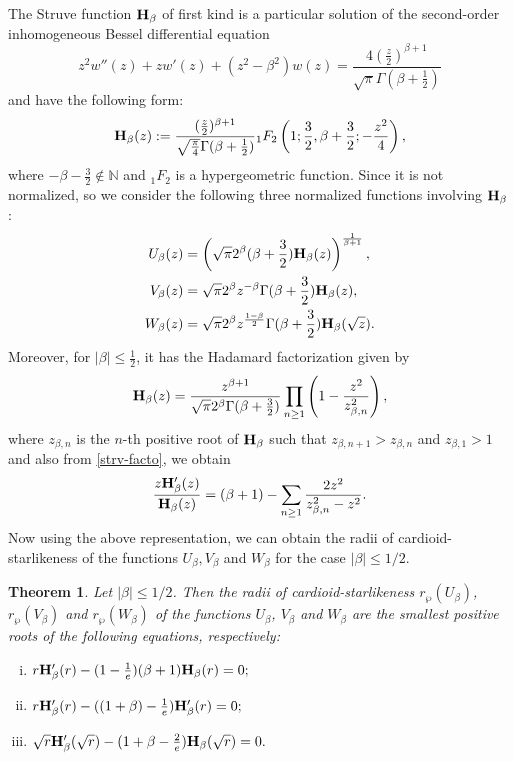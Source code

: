 \documentclass[12pt, reqno]{amsart}
\numberwithin{equation}{section}
\theoremstyle{plain}
\newtheorem{theorem}{Theorem}[section]
\theoremstyle{definition}
\theoremstyle{remark}
\begin{document}
The Struve function $\mathcal{\bf{H}}_{\beta}$ of first kind is a particular solution of the second-order inhomogeneous Bessel differential equation $$z^2w''(z)+zw'(z)+(z^2-{\beta}^2)w(z)=\frac{4(\frac{z}{2})^{\beta+1}}{\sqrt{\pi}\Gamma(\beta+\frac{1}{2})}$$ and have the following form:
\begin{equation*}
\mathcal{\bf{H}}_{\beta}(z):=\frac{(\frac{z}{2})^{\beta+1}}{\sqrt{\frac{\pi}{4}}\Gamma(\beta+\frac{1}{2})} {}_1 F_{2}\left(1;\frac{3}{2},\beta+\frac{3}{2};-\frac{z^2}{4}\right) ,
\end{equation*}
where $-\beta-\frac{3}{2}\notin\mathbb{N}$ and ${}_1 F_{2}$ is a hypergeometric function. Since it is not normalized, so we consider the following three normalized functions involving $\mathcal{\bf{H}}_{\beta}$ :
\begin{align}\label{nor-strv-uvw}
U_{\beta}(z)&=\left(\sqrt{\pi}2^{\beta}(\beta+\frac{3}{2}){\bf{H}}_{\beta}(z)\right)^{\frac{1}{\beta+1}},\nonumber\\
V_{\beta}(z)&=\sqrt{\pi}2^{\beta}z^{-\beta}\Gamma(\beta+\frac{3}{2}){\bf{H}}_{\beta}(z),\nonumber\\
W_{\beta}(z)&=\sqrt{\pi}2^{\beta}z^{\frac{1-\beta}{2}}\Gamma(\beta+\frac{3}{2}){\bf{H}}_{\beta}(\sqrt{z}).
\end{align}
Moreover, for $|\beta|\leq\frac{1}{2}$, it has the Hadamard factorization given by
\begin{equation}\label{strv-facto}
{\bf{H}}_{\beta}(z)=\frac{z^{\beta+1}}{\sqrt{\pi}2^{\beta}\Gamma(\beta+\frac{3}{2})}\prod_{n\geq1}\left(1-\frac{z^2}{z^2_{\beta,n}}\right),
\end{equation}
where $z_{\beta,n}$ is the $n$-th positive root of ${\bf{H}}_{\beta}$ such that $z_{\beta,n+1}>z_{\beta,n}$ and $z_{\beta,1}>1$ and also from \eqref{strv-facto}, we obtain
\begin{equation}\label{strv-strlike}
\frac{z{\bf{H}}'_{\beta}(z)}{{\bf{H}}_{\beta}(z)}=(\beta+1)-\sum_{n\geq1}\frac{2z^2}{z^2_{\beta,n}-z^2}.
\end{equation}
Now using the above representation, we can obtain the radii of cardioid-starlikeness of the functions $U_{\beta}, V_{\beta}$ and $W_{\beta}$ for the case $|\beta|\leq {1}/{2}$.
\begin{theorem}\label{Struv-thm}
	Let $|\beta|\leq {1}/{2}$. Then the radii of cardioid-starlikeness $r_{\wp}(U_{\beta})$, $r_{\wp}(V_{\beta})$ and $r_{\wp}(W_{\beta})$ of the functions $U_{\beta}$, $V_{\beta}$ and $W_{\beta}$ are the smallest positive roots of the following equations, respectively:
	\begin{enumerate}[(i)]
		\item $r{\bf{H}}'_{\beta}(r)-(1-\frac{1}{e})(\beta+1){\bf{H}}_{\beta}(r)=0;$
		\item $r{\bf{H}}'_{\beta}(r)-((1+\beta)-\frac{1}{e}){\bf{H}}'_{\beta}(r)=0;$
		\item $\sqrt{r}{\bf{H}}'_{\beta}(\sqrt{r})-(1+\beta-\frac{2}{e}){\bf{H}}_{\beta}(\sqrt{r})=0.$
	\end{enumerate}	
\end{theorem}
\end{document}

